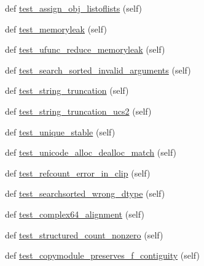 \begin{DoxyCompactItemize}
\item 
def \hyperlink{classnumpy_1_1core_1_1tests_1_1test__regression_1_1TestRegression_a17b268a995f9b398c8dbdc8821e8b201}{test\+\_\+assign\+\_\+obj\+\_\+listoflists} (self)
\item 
def \hyperlink{classnumpy_1_1core_1_1tests_1_1test__regression_1_1TestRegression_ac323712020089ad8834f870f71b83bfa}{test\+\_\+memoryleak} (self)
\item 
def \hyperlink{classnumpy_1_1core_1_1tests_1_1test__regression_1_1TestRegression_a1509ff3b735a1676b98bad09f92ab317}{test\+\_\+ufunc\+\_\+reduce\+\_\+memoryleak} (self)
\item 
def \hyperlink{classnumpy_1_1core_1_1tests_1_1test__regression_1_1TestRegression_a85a8418998e0727669ce4107cd45a92f}{test\+\_\+search\+\_\+sorted\+\_\+invalid\+\_\+arguments} (self)
\item 
def \hyperlink{classnumpy_1_1core_1_1tests_1_1test__regression_1_1TestRegression_aa49a89a6f371e7e72cb707c152afe6dc}{test\+\_\+string\+\_\+truncation} (self)
\item 
def \hyperlink{classnumpy_1_1core_1_1tests_1_1test__regression_1_1TestRegression_a60903f823ed1e570305e3611dffe2fa8}{test\+\_\+string\+\_\+truncation\+\_\+ucs2} (self)
\item 
def \hyperlink{classnumpy_1_1core_1_1tests_1_1test__regression_1_1TestRegression_a0a6eb69895a82456845fa30b350c8607}{test\+\_\+unique\+\_\+stable} (self)
\item 
def \hyperlink{classnumpy_1_1core_1_1tests_1_1test__regression_1_1TestRegression_a53c1799f0ea849b8c1c01b71becc4596}{test\+\_\+unicode\+\_\+alloc\+\_\+dealloc\+\_\+match} (self)
\item 
def \hyperlink{classnumpy_1_1core_1_1tests_1_1test__regression_1_1TestRegression_a5c9ea6027adb739adb1c328894814d3a}{test\+\_\+refcount\+\_\+error\+\_\+in\+\_\+clip} (self)
\item 
def \hyperlink{classnumpy_1_1core_1_1tests_1_1test__regression_1_1TestRegression_a7c9e17e868b28e1afbcd447597ce3bc6}{test\+\_\+searchsorted\+\_\+wrong\+\_\+dtype} (self)
\item 
def \hyperlink{classnumpy_1_1core_1_1tests_1_1test__regression_1_1TestRegression_a7136e8bb7e3df420b52a997f336d5447}{test\+\_\+complex64\+\_\+alignment} (self)
\item 
def \hyperlink{classnumpy_1_1core_1_1tests_1_1test__regression_1_1TestRegression_a6dd88c128a110333d0e05fc1f34b9dbf}{test\+\_\+structured\+\_\+count\+\_\+nonzero} (self)
\item 
def \hyperlink{classnumpy_1_1core_1_1tests_1_1test__regression_1_1TestRegression_aa91f9cd544c06d3460848052a58ccacb}{test\+\_\+copymodule\+\_\+preserves\+\_\+f\+\_\+contiguity} (self)

\end{DoxyCompactItemize}
